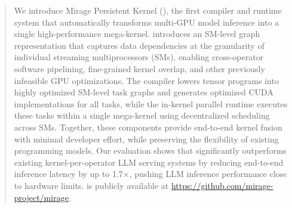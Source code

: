 \begin{abstract}
We introduce Mirage Persistent Kernel (\sys), the first compiler and runtime system that automatically transforms multi-GPU model inference into a single high-performance mega-kernel. \Sys introduces an SM-level graph representation that captures data dependencies at the granularity of individual streaming multiprocessors (SMs), enabling cross-operator software pipelining, fine-grained kernel overlap, and other previously infeasible GPU optimizations. The \sys compiler lowers tensor programs into highly optimized SM-level task graphs and generates optimized CUDA implementations for all tasks, while the \sys in-kernel parallel runtime executes these tasks within a single mega-kernel using decentralized scheduling across SMs. Together, these components provide end-to-end kernel fusion with minimal developer effort, while preserving the flexibility of existing programming models.
Our evaluation shows that \sys significantly outperforms existing kernel-per-operator LLM serving systems by reducing end-to-end inference latency by up to 1.7$\times$, pushing LLM inference performance close to hardware limits. \sys is publicly available at \url{https://github.com/mirage-project/mirage}.
\end{abstract}

